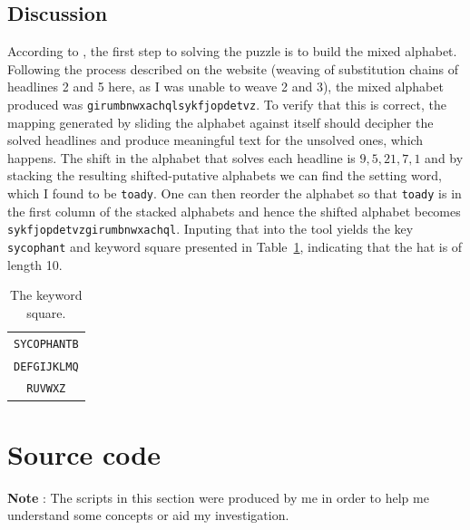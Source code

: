 \documentclass[12pt,a4paper,onecolumn]{article}
\begin{document}
\subsection{Discussion}
According to \citep{website:puzzle_info}, the first step to solving the puzzle is to build the mixed alphabet. Following the process described on the website (weaving of substitution chains of headlines 2 and 5 here, as I was unable to weave 2 and 3), the mixed alphabet produced was 
\texttt{girumbnwxachqlsykfjopdetvz}. To verify that this is correct, the mapping generated by sliding the alphabet against itself should decipher the solved headlines and produce meaningful text for the unsolved ones, which happens. The shift in the alphabet that solves each headline is $9, 5, 21, 7, 1$ and by stacking the resulting shifted-putative alphabets we can find the setting word, which I found to be \texttt{toady}. One can then reorder the alphabet so that \texttt{toady} is in the first column of the stacked alphabets and hence the shifted alphabet becomes  \texttt{sykfjopdetvzgirumbnwxachql}. Inputing that into the tool \citep{website:key_finder} yields the key \texttt{sycophant} and keyword square presented in Table~\ref{tab:ks}, indicating that the hat is of length 10.


\begin{table}
\center
\caption{The keyword square.}
\label{tab:ks}
	\begin{tabular}{c}
		\texttt{SYCOPHANTB}\\
		\texttt{DEFGIJKLMQ}\\
		\texttt{RUVWXZ}\\
	\end{tabular}
\end{table}





\pagebreak
\appendix
\section{Source code}

\textbf{Note} : The scripts in this section were produced by me in order to help me understand some concepts or aid my investigation. \\


\end{document}
